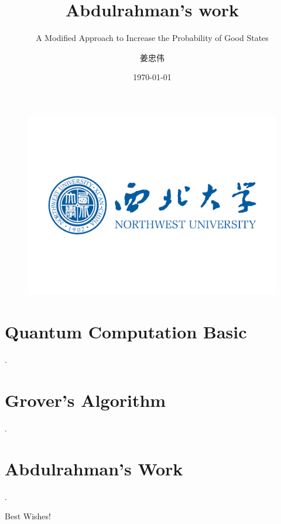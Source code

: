 \documentclass{beamer}
\author{姜忠伟}
\institute{西北大学物理学院}
\title{Abdulrahman's work}
\subtitle{A Modified Approach to Increase the Probability of Good States}
\date{\today}
\begin{document}
\kaishu
\begin{frame}
    \titlepage
    \begin{figure}[htpb]
        \begin{center}
            \includegraphics[width=0.4\linewidth]{pic/nwu-logo.png}
        \end{center}
    \end{figure}
\end{frame}

\begin{frame}
    \tableofcontents[sectionstyle=show,subsectionstyle=show/shaded/hide,subsubsectionstyle=show/shaded/hide]
\end{frame}



\section{Quantum Computation Basic}

\begin{frame}
    .
\end{frame}

\section{Grover's Algorithm}

\begin{frame}
    .
\end{frame}

\section{Abdulrahman's Work}

\begin{frame}
    .
\end{frame}

\begin{frame}
    \begin{center}
        {\Huge\calligra Best Wishes!}
    \end{center}
\end{frame}
\end{document}
